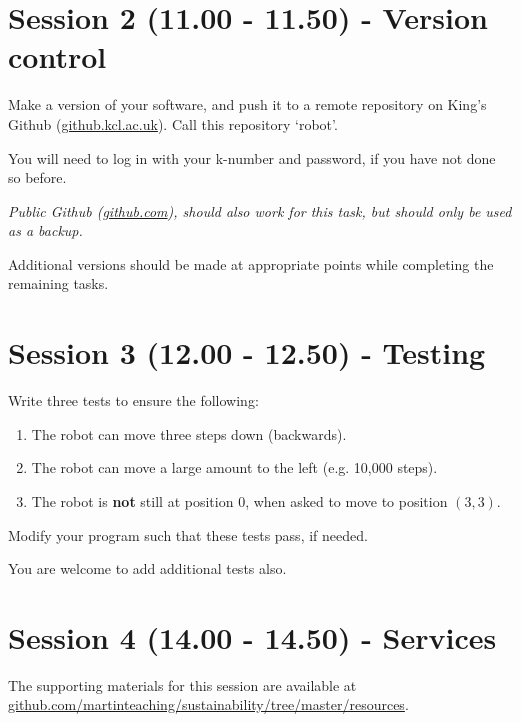 \documentclass{article}
\begin{document}
\section{Session 2 (11.00 - 11.50) - Version control}

Make a version of your software, and push it to a remote repository on King's Github (\href{https://github.kcl.ac.uk/}{github.kcl.ac.uk}).
Call this repository `robot'.

You will need to log in with your k-number and password, if you have not done so before.

\textit{Public Github (\href{https://github.com}{github.com}), should
also work for this task, but should only be used as a backup.}

Additional versions should be made at appropriate points while completing the remaining tasks.

\section{Session 3 (12.00 - 12.50) - Testing}

Write three tests to ensure the following:

\begin{enumerate}

    \item The robot can move three steps down (backwards).

    \item The robot can move a large amount to the left (e.g. 10,000 steps).

    \item The robot is \textbf{not} still at position 0, when asked to move to position $(3, 3)$.

\end{enumerate}

Modify your program such that these tests pass, if needed.

You are welcome to add additional tests also.

\section{Session 4 (14.00 - 14.50) - Services}

The supporting materials for this session are available at \newline
\href{https://github.com/martinteaching/sustainability/tree/master/resources}{github.com/martinteaching/sustainability/tree/master/resources}.
\end{document}
